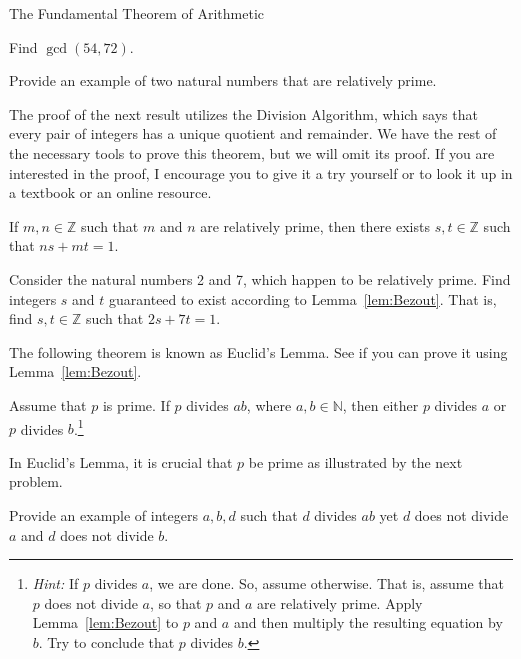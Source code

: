 \begin{section}{The Fundamental Theorem of Arithmetic}
\begin{exercise}
Find $\gcd(54,72)$.
\end{exercise}

\begin{exercise}
Provide an example of two natural numbers that are relatively prime.
\end{exercise}

The proof of the next result utilizes the Division Algorithm, which says that every pair of integers has a unique quotient and remainder. We have the rest of the necessary tools to prove this theorem, but we will omit its proof. If you are interested in the proof, I encourage you to give it a try yourself or to look it up in a textbook or an online resource.

\begin{lemma}\label{lem:Bezout}
If $m,n\in\mathbb{Z}$ such that $m$ and $n$ are relatively prime, then there exists $s,t\in\mathbb{Z}$ such that $ns+mt=1$.
\end{lemma} 

\begin{exercise}
Consider the natural numbers 2 and 7, which happen to be relatively prime.  Find integers $s$ and $t$ guaranteed to exist according to Lemma~\ref{lem:Bezout}.  That is, find $s,t\in\mathbb{Z}$ such that $2s+7t=1$.
\end{exercise}

The following theorem is known as Euclid's Lemma. See if you can prove it using Lemma~\ref{lem:Bezout}.

\begin{theorem}\label{thm:Euclid}
Assume that $p$ is prime.  If $p$ divides $ab$, where $a,b\in\mathbb{N}$, then either $p$ divides $a$ or $p$ divides $b$.\footnote{\emph{Hint:} If $p$ divides $a$, we are done.  So, assume otherwise.  That is, assume that $p$ does not divide $a$, so that $p$ and $a$ are relatively prime.  Apply Lemma~\ref{lem:Bezout} to $p$ and $a$ and then multiply the resulting equation by $b$. Try to conclude that $p$ divides $b$.}
\end{theorem}

In Euclid's Lemma, it is crucial that $p$ be prime as illustrated by the next problem.

\begin{problem}
Provide an example of integers $a, b, d$ such that $d$ divides $ab$ yet $d$ does not divide $a$ and $d$ does not divide $b$.
\end{problem}


\end{section}
